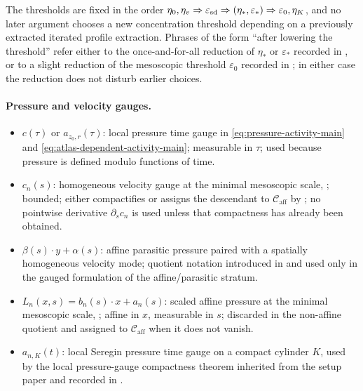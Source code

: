 \documentclass[11pt]{amsart}
\numberwithin{equation}{section}
\theoremstyle{plain}
\theoremstyle{definition}
\theoremstyle{remark}
\newcommand{\eps}{\varepsilon}
\newcommand{\Caff}{\mathcal C_{\mathrm{aff}}}
\begin{document}
The thresholds are fixed in the order
\(\eta_0,\eta_v\Rightarrow\eps_{\rm sd}\Rightarrow(\eta_*,\eps_*)\Rightarrow\eps_0,
\eta_K\), and no later argument chooses a new concentration threshold depending
on a previously extracted iterated profile extraction.  Phrases of the form ``after lowering
the threshold'' refer either to the once-and-for-all reduction of \(\eta_*\)
or \(\eps_*\) recorded in , or to a slight
reduction of the mesoscopic threshold \(\eps_0\) recorded in
; in either case the reduction does not
disturb earlier choices.

\paragraph{Pressure and velocity gauges.}
\begin{itemize}[leftmargin=1.6em]
   \item \(c(\tau)\) or \(a_{z_0,r}(\tau)\): local pressure time gauge in
      \eqref{eq:pressure-activity-main} and
      \eqref{eq:atlas-dependent-activity-main};
      measurable in \(\tau\); used because pressure is defined modulo functions
      of time.
   \item \(c_n(s)\): homogeneous velocity gauge at the minimal mesoscopic
      scale, ; bounded; either compactifies
      or assigns the descendant to \(\Caff\) by
      ; no pointwise derivative
      \(\partial_s c_n\) is used unless that compactness has already been
      obtained.
   \item \(\beta(s)\cdot y+\alpha(s)\): affine parasitic pressure paired with a
      spatially homogeneous velocity mode; quotient notation introduced in
       and used only in the gauged
      formulation of the affine/parasitic stratum.
   \item \(L_n(x,s)=b_n(s)\cdot x+a_n(s)\): scaled affine pressure at the
      minimal mesoscopic scale, ;
      affine in \(x\), measurable in \(s\); discarded in the non-affine quotient
      and assigned to \(\Caff\) when it does not vanish.
   \item \(a_{n,K}(t)\): local Seregin pressure time gauge on a compact
      cylinder \(K\), used by the local pressure-gauge compactness theorem
      inherited from the setup paper and recorded in
      .
\end{itemize}
\end{document}
